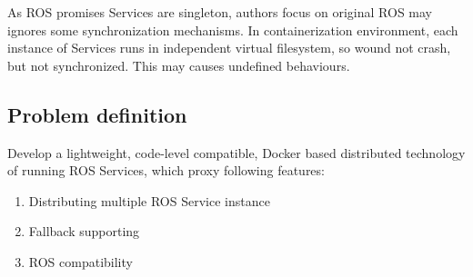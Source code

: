 As ROS promises Services are singleton, authors focus on original ROS may ignores some
synchronization mechanisms.
In containerization environment, each instance of Services runs in independent virtual
filesystem, so wound not crash, but not synchronized. This may causes undefined behaviours.

\subsection{Problem definition}

Develop a lightweight, code-level compatible, Docker based distributed technology of running ROS Services, which proxy following features:

\begin{enumerate}
    \item Distributing multiple ROS Service instance \label{feature:mul}
    \item Fallback supporting \label{feature:fallback}
    \item ROS compatibility \label{feature:comp}
\end{enumerate}


